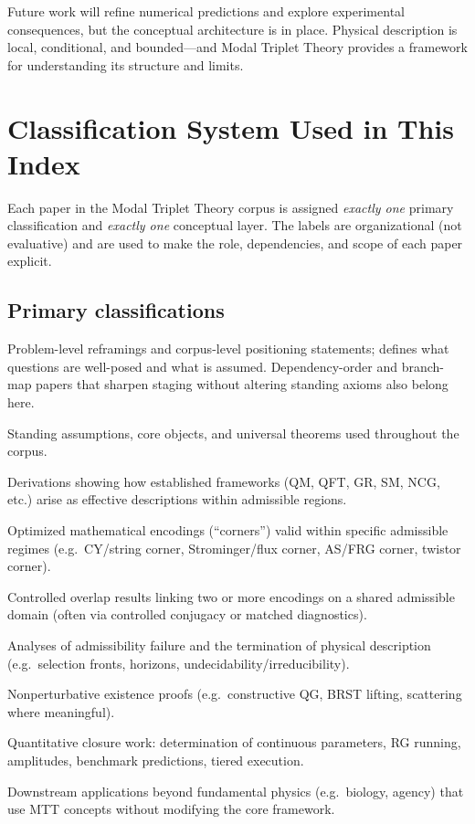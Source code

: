 \documentclass[11pt]{article}
\begin{document}
Future work will refine numerical predictions and explore experimental consequences, but the conceptual architecture is in place. Physical description is local, conditional, and bounded—and Modal Triplet Theory provides a framework for understanding its structure and limits.

\section{Classification System Used in This Index}

Each paper in the Modal Triplet Theory corpus is assigned \emph{exactly one} primary
classification and \emph{exactly one} conceptual layer. The labels are organizational (not
evaluative) and are used to make the role, dependencies, and scope of each paper explicit.

\subsection{Primary classifications}

\begin{description}[leftmargin=!,labelwidth=4.6cm]
\item[Meta / Diagnosis] Problem-level reframings and corpus-level positioning statements; defines
what questions are well-posed and what is assumed. Dependency-order and branch-map papers
that sharpen staging without altering standing axioms also belong here.
\item[Core / Axiomatic] Standing assumptions, core objects, and universal theorems used throughout
the corpus.
\item[Reconstruction] Derivations showing how established frameworks (QM, QFT, GR, SM, NCG, etc.)
arise as effective descriptions within admissible regions.
\item[Primary Encoding] Optimized mathematical encodings (“corners”) valid within specific admissible
regimes (e.g.\ CY/string corner, Strominger/flux corner, AS/FRG corner, twistor corner).
\item[Overlap / Shadow Bridge] Controlled overlap results linking two or more encodings on a shared
admissible domain (often via controlled conjugacy or matched diagnostics).
\item[Boundary Regime] Analyses of admissibility failure and the termination of physical description
(e.g.\ selection fronts, horizons, undecidability/irreducibility).
\item[Constructive Existence] Nonperturbative existence proofs (e.g.\ constructive QG, BRST lifting,
scattering where meaningful).
\item[Numerics / Phenomenology] Quantitative closure work: determination of continuous parameters,
RG running, amplitudes, benchmark predictions, tiered execution.
\item[Extension (Non-fundamental)] Downstream applications beyond fundamental physics (e.g.\ biology,
agency) that use MTT concepts without modifying the core framework.
\end{description}
\end{document}
